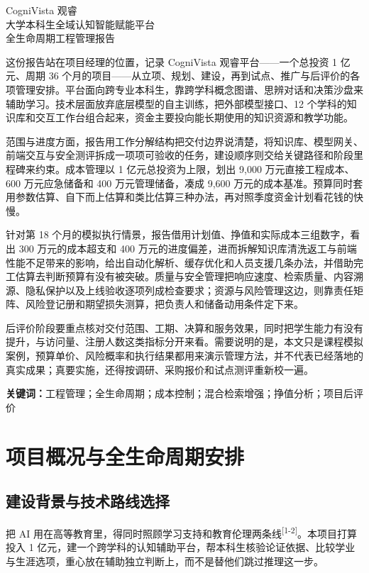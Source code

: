 \documentclass[UTF8,12pt,a4paper]{ctexart}
\renewenvironment{abstract}{%
  \par\vspace{4pt}%
  {\centering\zihao{-4}\heiti \abstractname\par}%
  \vspace{9pt}\linespread{1}\fontsize{12pt}{21pt}\selectfont\par%
}{%
  \par\vspace{8pt}%
}
\newcommand{\papertitle}{CogniVista 观睿\\[5pt]大学本科生全域认知智能赋能平台\\[7pt]全生命周期工程管理报告}
\begin{document}
\pagestyle{plain} %

{\centering\fontsize{18pt}{25pt}\selectfont\heiti \papertitle\par}
\vspace{10pt}

\begin{abstract}
这份报告站在项目经理的位置，记录 CogniVista 观睿平台——一个总投资 1 亿元、周期 36 个月的项目——从立项、规划、建设，再到试点、推广与后评价的各项管理安排。平台面向跨专业本科生，靠跨学科概念图谱、思辨对话和决策沙盘来辅助学习。技术层面放弃底层模型的自主训练，把外部模型接口、12 个学科的知识库和交互工作台组合起来，资金主要投向能长期使用的知识资源和教学功能。

范围与进度方面，报告用工作分解结构把交付边界说清楚，将知识库、模型网关、前端交互与安全测评拆成一项项可验收的任务，建设顺序则交给关键路径和阶段里程碑来约束。成本管理以 1 亿元总投资为上限，划出 9,000 万元直接工程成本、600 万元应急储备和 400 万元管理储备，凑成 9,600 万元的成本基准。预算同时套用参数估算、自下而上估算和类比估算三种办法，再对照季度资金计划看花钱的快慢。

针对第 18 个月的模拟执行情景，报告借用计划值、挣值和实际成本三组数字，看出 300 万元的成本超支和 400 万元的进度偏差，进而拆解知识库清洗返工与前端性能不足带来的影响，给出自动化解析、缓存优化和人员支援几条办法，并借助完工估算去判断预算有没有被突破。质量与安全管理把响应速度、检索质量、内容溯源、隐私保护以及上线验收逐项列成检查要求；资源与风险管理这边，则靠责任矩阵、风险登记册和期望损失测算，把负责人和储备动用条件定下来。

后评价阶段要重点核对交付范围、工期、决算和服务效果，同时把学生能力有没有提升，与访问量、注册人数这类指标分开来看。需要说明的是，本文只是课程模拟案例，预算单价、风险概率和执行结果都用来演示管理方法，并不代表已经落地的真实成果；真要实施，还得按调研、采购报价和试点测评重新校一遍。
\end{abstract}

{\fontsize{10.5pt}{17pt}\selectfont\noindent\textbf{关键词：}工程管理；全生命周期；成本控制；混合检索增强；挣值分析；项目后评价\par}
\clearpage

\section{项目概况与全生命周期安排}

\subsection{建设背景与技术路线选择}
把 AI 用在高等教育里，得同时照顾学习支持和教育伦理两条线\textsuperscript{[1-2]}。本项目打算投入 1 亿元，建一个跨学科的认知辅助平台，帮本科生核验论证依据、比较学业与生涯选项，重心放在辅助独立判断上，而不是替他们跳过推理这一步。
\end{document}
